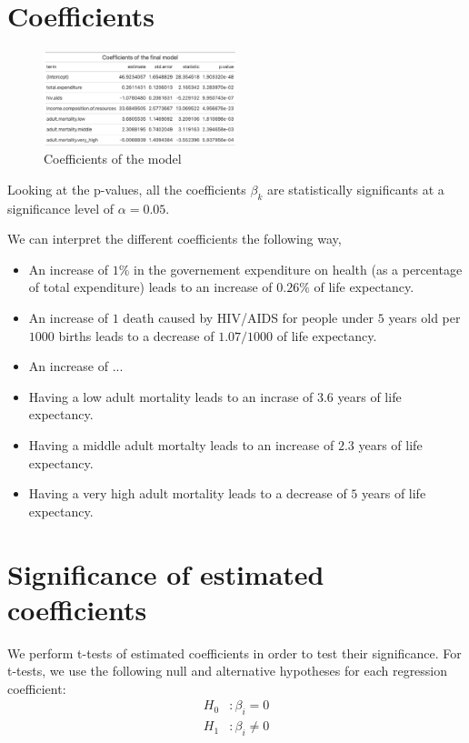 \section{Coefficients}

\begin{figure}[H]
	\centering
	\includegraphics[width=0.5\textwidth]{figures/coefficients/coeff-model.png}
	\caption{Coefficients of the model}
	\label{fig:coeff-model}
\end{figure}

Looking at the p-values, all the coefficients $\beta_k$ are statistically significants at a significance level of $\alpha = 0.05$.

We can interpret the different coefficients the following way,
\begin{itemize}
	\item An increase of $1\%$ in the governement expenditure on health (as a percentage of total expenditure) leads to an increase of $0.26\%$ of life expectancy.
	\item An increase of $1$ death caused by HIV/AIDS for people under $5$ years old per $1000$ births leads to a decrease of $1.07/1000$ of life expectancy.
	\item An increase of ...
	\item Having a low adult mortality leads to an incrase of $3.6$ years of life expectancy.
	\item Having a middle adult mortalty leads to an increase of $2.3$ years of life expectancy.
	\item Having a very high adult mortality leads to a decrease of $5$ years of life expectancy.
\end{itemize}


\section{Significance of estimated coefficients}

We perform t-tests of estimated coefficients in order to test their significance. For t-tests, we use the following null and alternative hypotheses for each regression coefficient: 
\begin{align*}
	H_0&: \beta_i = 0 \\
	H_1&: \beta_i \neq 0
\end{align*}

